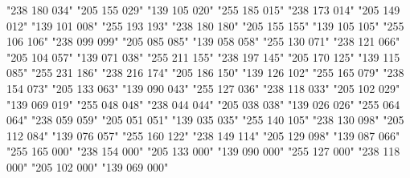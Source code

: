        {"238 180 034"}
       {"205 155 029"}
       {"139 105 020"}        
  {"255 185 015"}
  {"238 173 014"}
  {"205 149 012"}
  {"139 101 008"}
      {"255 193 193"}
      {"238 180 180"}
      {"205 155 155"}
      {"139 105 105"}
      {"255 106 106"}
      {"238 099 099"}
      {"205 085 085"}
      {"139 058 058"}
          {"255 130 071"}
          {"238 121 066"}
          {"205 104 057"}
          {"139 071 038"}
       {"255 211 155"}
       {"238 197 145"}
       {"205 170 125"}
       {"139 115 085"}
           {"255 231 186"}
           {"238 216 174"}
           {"205 186 150"}
           {"139 126 102"}
             {"255 165 079"}
             {"238 154 073"}
             {"205 133 063"}
             {"139 090 043"}
       {"255 127 036"}        
       {"238 118 033"}
       {"205 102 029"}
       {"139 069 019"}
       {"255 048 048"}
       {"238 044 044"}
       {"205 038 038"}
       {"139 026 026"}
           {"255 064 064"}
           {"238 059 059"}
           {"205 051 051"}
           {"139 035 035"}
          {"255 140 105"}
          {"238 130 098"}
          {"205 112 084"}
          {"139 076 057"}        
    {"255 160 122"}
    {"238 149 114"}
    {"205 129 098"}
    {"139 087 066"}
          {"255 165 000"}
          {"238 154 000"}
          {"205 133 000"}
          {"139 090 000"}
     {"255 127 000"}
     {"238 118 000"}
     {"205 102 000"}
     {"139 069 000"}
